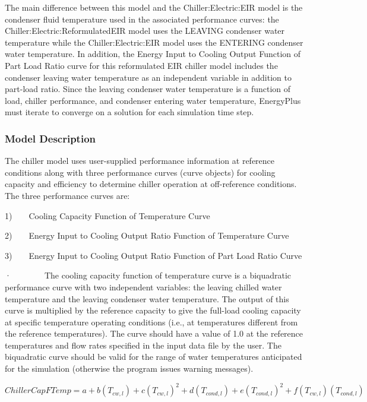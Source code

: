 The main difference between this model and the Chiller:Electric:EIR model is the condenser fluid temperature used in the associated performance curves: the Chiller:Electric:ReformulatedEIR model uses the LEAVING condenser water temperature while the Chiller:Electric:EIR model uses the ENTERING condenser water temperature. In addition, the Energy Input to Cooling Output Function of Part Load Ratio curve for this reformulated EIR chiller model includes the condenser leaving water temperature as an independent variable in addition to part-load ratio. Since the leaving condenser water temperature is a function of load, chiller performance, and condenser entering water temperature, EnergyPlus must iterate to converge on a solution for each simulation time step.

\subsubsection{Model Description}\label{model-description-3-002}

The chiller model uses user-supplied performance information at reference conditions along with three performance curves (curve objects) for cooling capacity and efficiency to determine chiller operation at off-reference conditions. The three performance curves are:

1)~~~~Cooling Capacity Function of Temperature Curve

2)~~~~Energy Input to Cooling Output Ratio Function of Temperature Curve

3)~~~~Energy Input to Cooling Output Ratio Function of Part Load Ratio Curve

·~~~~~~~~The cooling capacity function of temperature curve is a biquadratic performance curve with two independent variables: the leaving chilled water temperature and the leaving condenser water temperature. The output of this curve is multiplied by the reference capacity to give the full-load cooling capacity at specific temperature operating conditions (i.e., at temperatures different from the reference temperatures). The curve should have a value of 1.0 at the reference temperatures and flow rates specified in the input data file by the user. The biquadratic curve should be valid for the range of water temperatures anticipated for the simulation (otherwise the program issues warning messages).

\begin{equation}
ChillerCapFTemp = a + b({T_{cw,l}}) + c{({T_{cw,l}})^2} + d({T_{cond,l}}) + e{({T_{cond,l}})^2} + f({T_{cw,l}})({T_{cond,l}})
\end{equation}

